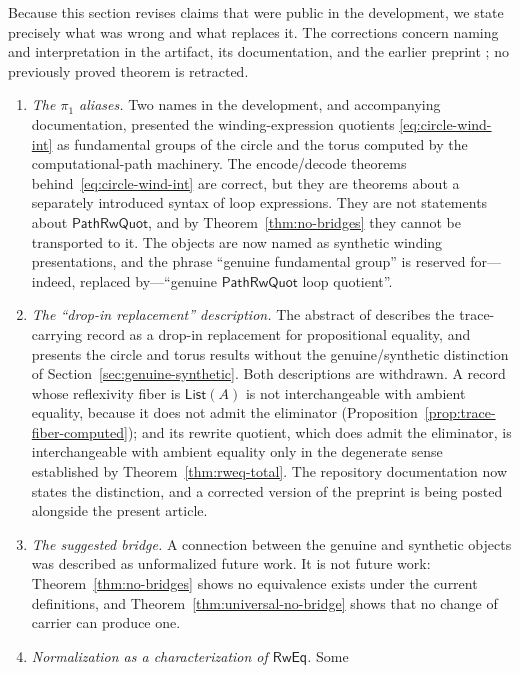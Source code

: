 \documentclass[10pt,reqno]{amsart}
\newcommand{\List}{\mathsf{List}}
\newcommand{\PRW}{\mathsf{PathRwQuot}}
\begin{document}
Because this section revises claims that were public in the development, we
state precisely what was wrong and what replaces it.  The corrections concern
naming and interpretation in the artifact, its documentation, and the earlier
preprint \cite{ComputationalPathsArxiv2025}; no previously proved theorem is
retracted.

\begin{enumerate}[label=(C\arabic*),leftmargin=3.1em]
\item \emph{The \(\pi_1\) aliases.}  Two names in the development, and
  accompanying documentation, presented the winding-expression quotients
  \eqref{eq:circle-wind-int} as fundamental groups of the
  circle and the torus computed by the computational-path machinery.  The
  encode/decode theorems behind~\eqref{eq:circle-wind-int}
  are correct, but they are theorems about a separately introduced syntax of
  loop expressions.  They are not statements about \(\PRW\), and by
  Theorem~\ref{thm:no-bridges} they cannot be transported to it.  The objects
  are now named as synthetic winding presentations, and the phrase ``genuine
  fundamental group'' is reserved for---indeed, replaced by---``genuine
  \(\PRW\) loop quotient''.
\item \emph{The ``drop-in replacement'' description.}  The abstract of
  \cite{ComputationalPathsArxiv2025} describes the trace-carrying record as a
  drop-in replacement for propositional equality, and presents the circle and
  torus results without the genuine/synthetic distinction of
  Section~\ref{sec:genuine-synthetic}.  Both descriptions are withdrawn.  A
  record whose reflexivity fiber is \(\List(A)\) is not interchangeable with
  ambient equality, because it does not admit the eliminator
  (Proposition~\ref{prop:trace-fiber-computed}); and its rewrite quotient,
  which does admit the eliminator, is interchangeable with ambient equality
  only in the degenerate sense established by Theorem~\ref{thm:rweq-total}.
  The repository documentation now states the distinction, and a corrected
  version of the preprint is being posted alongside the present article.
\item \emph{The suggested bridge.}  A connection between the genuine and
  synthetic objects was described as unformalized future work.  It is not
  future work: Theorem~\ref{thm:no-bridges} shows no equivalence exists under
  the current definitions, and Theorem~\ref{thm:universal-no-bridge} shows that
  no change of carrier can produce one.
\item \emph{Normalization as a characterization of \(\mathsf{RwEq}\).}  Some

\end{enumerate}
\end{document}
